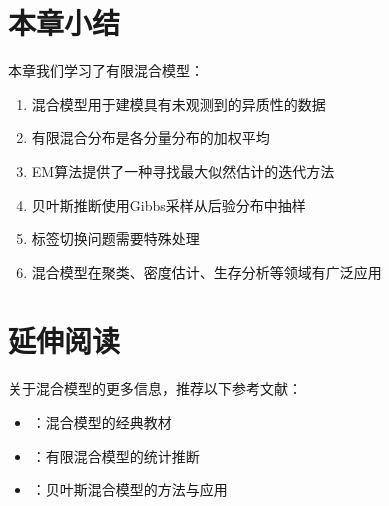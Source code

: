 \section{本章小结}

本章我们学习了有限混合模型：

\begin{enumerate}
  \item 混合模型用于建模具有未观测到的异质性的数据
  \item 有限混合分布是各分量分布的加权平均
  \item EM算法提供了一种寻找最大似然估计的迭代方法
  \item 贝叶斯推断使用Gibbs采样从后验分布中抽样
  \item 标签切换问题需要特殊处理
  \item 混合模型在聚类、密度估计、生存分析等领域有广泛应用
\end{enumerate}

\section{延伸阅读}

关于混合模型的更多信息，推荐以下参考文献：

\begin{itemize}
  \item \cite{McLachlan2007}：混合模型的经典教材
  \item \cite{Fruwirth2006}：有限混合模型的统计推断
  \item \cite{Robert1995}：贝叶斯混合模型的方法与应用
\end{itemize}

\endinput
